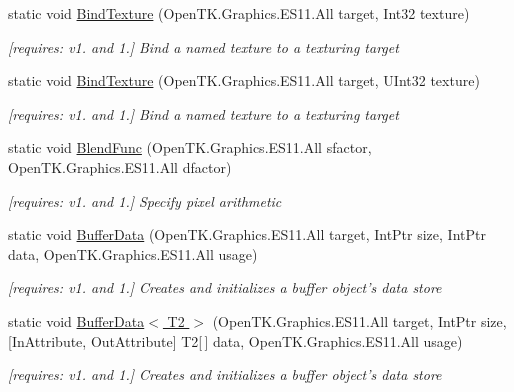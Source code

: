 \begin{DoxyCompactItemize}
static void \hyperlink{class_open_t_k_1_1_graphics_1_1_e_s11_1_1_g_l_a26a38f6e4537e0173a7e94d49fdb79c4}{Bind\-Texture} (Open\-T\-K.\-Graphics.\-E\-S11.\-All target, Int32 texture)
\begin{DoxyCompactList}\small\item\em \mbox{[}requires\-: v1. and 1.\mbox{]} Bind a named texture to a texturing target \end{DoxyCompactList}\item 
static void \hyperlink{class_open_t_k_1_1_graphics_1_1_e_s11_1_1_g_l_a63d61b8a47665eb64ca2de8ad081f24b}{Bind\-Texture} (Open\-T\-K.\-Graphics.\-E\-S11.\-All target, U\-Int32 texture)
\begin{DoxyCompactList}\small\item\em \mbox{[}requires\-: v1. and 1.\mbox{]} Bind a named texture to a texturing target \end{DoxyCompactList}\item 
static void \hyperlink{class_open_t_k_1_1_graphics_1_1_e_s11_1_1_g_l_a82e7e51736b9fe50d6ef8e7e3890be18}{Blend\-Func} (Open\-T\-K.\-Graphics.\-E\-S11.\-All sfactor, Open\-T\-K.\-Graphics.\-E\-S11.\-All dfactor)
\begin{DoxyCompactList}\small\item\em \mbox{[}requires\-: v1. and 1.\mbox{]} Specify pixel arithmetic \end{DoxyCompactList}\item 
static void \hyperlink{class_open_t_k_1_1_graphics_1_1_e_s11_1_1_g_l_a360083c929bc9788b67f99a341ad1511}{Buffer\-Data} (Open\-T\-K.\-Graphics.\-E\-S11.\-All target, Int\-Ptr size, Int\-Ptr data, Open\-T\-K.\-Graphics.\-E\-S11.\-All usage)
\begin{DoxyCompactList}\small\item\em \mbox{[}requires\-: v1. and 1.\mbox{]} Creates and initializes a buffer object's data store \end{DoxyCompactList}\item 
static void \hyperlink{class_open_t_k_1_1_graphics_1_1_e_s11_1_1_g_l_a89da2502a1420cf790ad6cced8fa98c2}{Buffer\-Data$<$ T2 $>$} (Open\-T\-K.\-Graphics.\-E\-S11.\-All target, Int\-Ptr size, \mbox{[}In\-Attribute, Out\-Attribute\mbox{]} T2\mbox{[}$\,$\mbox{]} data, Open\-T\-K.\-Graphics.\-E\-S11.\-All usage)
\begin{DoxyCompactList}\small\item\em \mbox{[}requires\-: v1. and 1.\mbox{]} Creates and initializes a buffer object's data store \end{DoxyCompactList}\item 

\end{DoxyCompactItemize}
